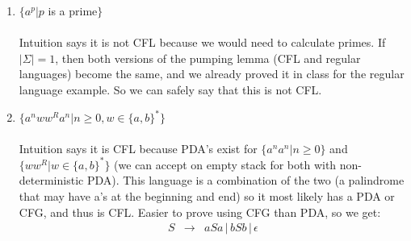 \documentclass[10pt,a4paper,final]{article}
\begin{document}
\begin{enumerate}
\begin{enumerate}
  \item %
  $\{a^p|p$ is a prime$\}$ \\
  \\
  Intuition says it is not CFL because we would need to calculate primes.
  If $|\Sigma| = 1$, then both versions of the pumping lemma (CFL and regular languages)
  become the same, and we already proved it in class for the regular language example.
  So we can safely say that this is not CFL.
  
  \item %
  $\{a^n ww^R a^n | n \geq 0, w \in \{a,b\}^*\}$ \\
  \\
  Intuition says it is CFL because PDA's exist for $\{a^n a^n | n \geq 0\}$ and $\{ww^R | w \in \{a,b\}^*\}$
  (we can accept on empty stack for both with non-deterministic PDA). This language is a combination of the
  two (a palindrome that may have a's at the beginning and end) so it most likely has a PDA or CFG, and thus is CFL.
  Easier to prove using CFG than PDA, so we get:
  \begin{align*}
    S &\rightarrow& aSa \,|\, bSb \,|\, \epsilon
  \end{align*}
\end{enumerate}

\end{enumerate}
\end{document}
